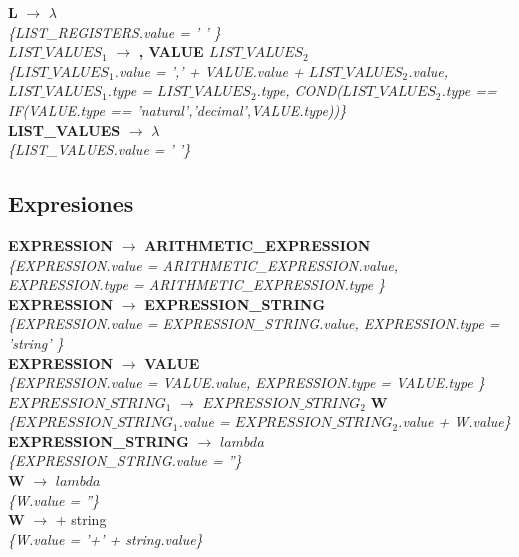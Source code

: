 \documentclass[10pt,a4paper]{article}
\begin{document}
\textbf{L} $\rightarrow$ $\lambda$\\
\textit{\{LIST\_REGISTERS.value =  ' ' \}}  \\ 

\textbf{$LIST\_VALUES_1$} $\rightarrow$ \textbf{, VALUE $LIST\_VALUES_2$} \\
\textit{\{$LIST\_VALUES_1$.value =  ',' + VALUE.value + $LIST\_VALUES_2$.value, $LIST\_VALUES_1$.type = $LIST\_VALUES_2$.type, COND($LIST\_VALUES_2$.type == IF(VALUE.type == 'natural','decimal',VALUE.type))\}} \\

\textbf{LIST\_VALUES} $\rightarrow$ $\lambda$ \\
\textit{\{LIST\_VALUES.value = ' '\}} \\

\subsection{Expresiones}
\textbf{EXPRESSION} $\rightarrow$ \textbf{ARITHMETIC\_EXPRESSION} \\   
\textit{\{EXPRESSION.value =  ARITHMETIC\_EXPRESSION.value, EXPRESSION.type = ARITHMETIC\_EXPRESSION.type \}}  \\

\textbf{EXPRESSION} $\rightarrow$ \textbf{EXPRESSION\_STRING} \\
\textit{\{EXPRESSION.value =  EXPRESSION\_STRING.value, EXPRESSION.type = 'string' \}}  \\ 

\textbf{EXPRESSION} $\rightarrow$ \textbf{VALUE} \\
\textit{\{EXPRESSION.value =  VALUE.value, EXPRESSION.type = VALUE.type \}} \\

\textbf{$EXPRESSION\_STRING_1$} $\rightarrow$ \textbf{$EXPRESSION\_STRING_2$} \textbf{W}
\\ \textit{\{$EXPRESSION\_STRING_1$.value =  $EXPRESSION\_STRING_2$.value + W.value\}} \\

\textbf{EXPRESSION\_STRING} $\rightarrow$  $lambda$ \\ 
\textit{\{EXPRESSION\_STRING.value = ''\}} \\

\textbf{W} $\rightarrow$  $lambda$ \\ 
\textit{\{W.value = ''\}} \\

\textbf{W} $\rightarrow$ + string \\ 
\textit{\{W.value = '+' + string.value\}} \\
\end{document}
